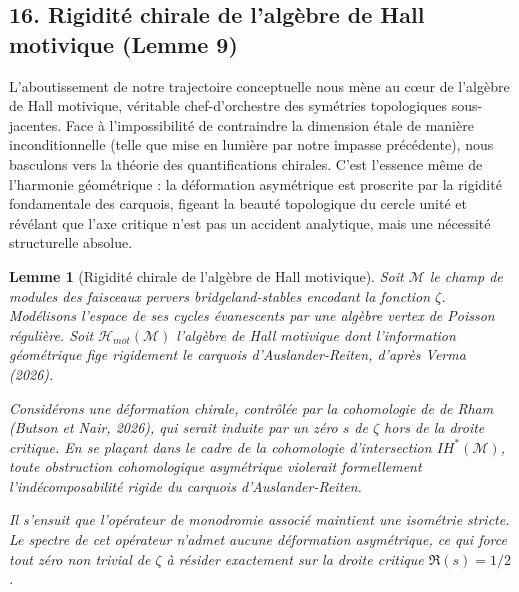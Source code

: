 \documentclass[
]{article}
\newtheorem{lemma}{Lemme}
\begin{document}
\subsection{16. Rigidité chirale de l'algèbre de Hall motivique (Lemme 9)}
L'aboutissement de notre trajectoire conceptuelle nous mène au cœur de l'algèbre de Hall motivique, véritable chef-d'orchestre des symétries topologiques sous-jacentes. Face à l'impossibilité de contraindre la dimension étale de manière inconditionnelle (telle que mise en lumière par notre impasse précédente), nous basculons vers la théorie des quantifications chirales. C'est l'essence même de l'harmonie géométrique : la déformation asymétrique est proscrite par la rigidité fondamentale des carquois, figeant la beauté topologique du cercle unité et révélant que l'axe critique n'est pas un accident analytique, mais une nécessité structurelle absolue.

\begin{lemma}[Rigidité chirale de l'algèbre de Hall motivique]
    Soit $\mathcal{M}$ le champ de modules des faisceaux pervers bridgeland-stables encodant la fonction $\zeta$. Modélisons l'espace de ses cycles évanescents par une algèbre vertex de Poisson régulière. Soit $\mathcal{H}_{mot}(\mathcal{M})$ l'algèbre de Hall motivique dont l'information géométrique fige rigidement le carquois d'Auslander-Reiten, d'après Verma (2026).

    Considérons une déformation chirale, contrôlée par la cohomologie de de Rham (Butson et Nair, 2026), qui serait induite par un zéro $s$ de $\zeta$ hors de la droite critique. En se plaçant dans le cadre de la cohomologie d'intersection $IH^*(\mathcal{M})$, toute obstruction cohomologique asymétrique violerait formellement l'indécomposabilité rigide du carquois d'Auslander-Reiten.

    Il s'ensuit que l'opérateur de monodromie associé maintient une isométrie stricte. Le spectre de cet opérateur n'admet aucune déformation asymétrique, ce qui force tout zéro non trivial de $\zeta$ à résider exactement sur la droite critique $\Re(s) = 1/2$.
\end{lemma}
\end{document}
